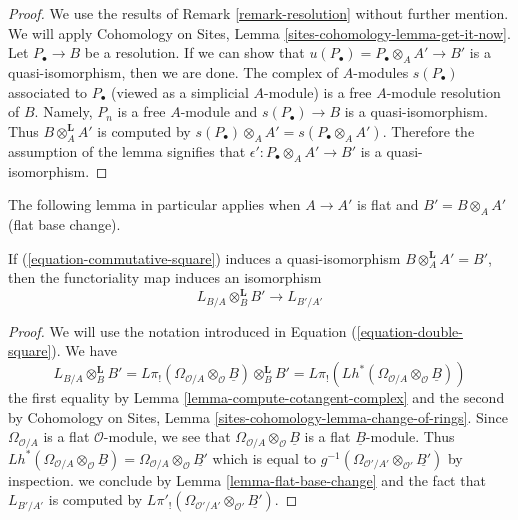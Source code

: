 \begin{proof}
We use the results of Remark \ref{remark-resolution} without
further mention. We will apply Cohomology on Sites, Lemma
\ref{sites-cohomology-lemma-get-it-now}. Let $P_\bullet \to B$ be a resolution.
If we can show that $u(P_\bullet) = P_\bullet \otimes_A A' \to B'$
is a quasi-isomorphism, then we are done. The complex of $A$-modules
$s(P_\bullet)$ associated to $P_\bullet$ (viewed as a simplicial $A$-module)
is a free $A$-module resolution of $B$. Namely, $P_n$ is a free $A$-module and
$s(P_\bullet) \to B$ is a quasi-isomorphism. Thus $B \otimes_A^\mathbf{L} A'$
is computed by $s(P_\bullet) \otimes_A A' = s(P_\bullet \otimes_A A')$.
Therefore the assumption of the lemma signifies that
$\epsilon' : P_\bullet \otimes_A A' \to B'$ is a quasi-isomorphism.
\end{proof}

\noindent
The following lemma in particular applies when $A \to A'$ is flat
and $B' = B \otimes_A A'$ (flat base change).

\begin{lemma}
\label{lemma-flat-base-change-cotangent-complex}
If (\ref{equation-commutative-square}) induces a quasi-isomorphism
$B \otimes_A^\mathbf{L} A' = B'$, then the functoriality map
induces an isomorphism
$$
L_{B/A} \otimes_B^\mathbf{L} B' \longrightarrow L_{B'/A'}
$$
\end{lemma}

\begin{proof}
We will use the notation introduced in Equation (\ref{equation-double-square}).
We have
$$
L_{B/A} \otimes_B^\mathbf{L} B' =
L\pi_!(\Omega_{\mathcal{O}/A} \otimes_\mathcal{O} \underline{B})
\otimes_B^\mathbf{L} B' =
L\pi_!(Lh^*(\Omega_{\mathcal{O}/A} \otimes_\mathcal{O} \underline{B}))
$$
the first equality by Lemma \ref{lemma-compute-cotangent-complex}
and the second by Cohomology on Sites, Lemma
\ref{sites-cohomology-lemma-change-of-rings}.
Since $\Omega_{\mathcal{O}/A}$ is a flat $\mathcal{O}$-module,
we see that $\Omega_{\mathcal{O}/A} \otimes_\mathcal{O} \underline{B}$
is a flat $\underline{B}$-module. Thus
$Lh^*(\Omega_{\mathcal{O}/A} \otimes_\mathcal{O} \underline{B}) =
\Omega_{\mathcal{O}/A} \otimes_\mathcal{O} \underline{B'}$
which is equal to
$g^{-1}(\Omega_{\mathcal{O}'/A'} \otimes_{\mathcal{O}'} \underline{B'})$
by inspection.
we conclude by Lemma \ref{lemma-flat-base-change}
and the fact that $L_{B'/A'}$ is computed by
$L\pi'_!(\Omega_{\mathcal{O}'/A'} \otimes_{\mathcal{O}'} \underline{B'})$.
\end{proof}

